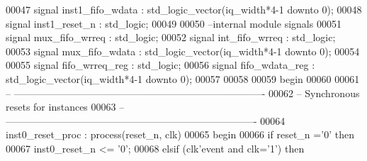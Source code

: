 \begin{DoxyCode}
00047 \textcolor{keywordflow}{signal} \textcolor{vhdlchar}{inst1_fifo_wdata} \textcolor{vhdlchar}{:} \textcolor{comment}{std\_logic\_vector}\textcolor{vhdlchar}{(}\textcolor{vhdlchar}{iq_width}\textcolor{vhdlchar}{*}\textcolor{vhdllogic}{4-1} \textcolor{keywordflow}{downto} \textcolor{vhdllogic}{}\textcolor{vhdllogic}{0}\textcolor{vhdlchar}{)};
00048 \textcolor{keywordflow}{signal} \textcolor{vhdlchar}{inst1_reset_n}        \textcolor{vhdlchar}{:} \textcolor{comment}{std\_logic};
00049 
00050 \textcolor{keyword}{--internal module signals}
00051 \textcolor{keywordflow}{signal} \textcolor{vhdlchar}{mux_fifo_wrreq}   \textcolor{vhdlchar}{:} \textcolor{comment}{std\_logic};
00052 \textcolor{keywordflow}{signal} \textcolor{vhdlchar}{int_fifo_wrreq}   \textcolor{vhdlchar}{:} \textcolor{comment}{std\_logic};
00053 \textcolor{keywordflow}{signal} \textcolor{vhdlchar}{mux_fifo_wdata}   \textcolor{vhdlchar}{:} \textcolor{comment}{std\_logic\_vector}\textcolor{vhdlchar}{(}\textcolor{vhdlchar}{iq_width}\textcolor{vhdlchar}{*}\textcolor{vhdllogic}{4-1} \textcolor{keywordflow}{downto} \textcolor{vhdllogic}{}\textcolor{vhdllogic}{0}\textcolor{vhdlchar}{)};
00054 
00055 \textcolor{keywordflow}{signal} \textcolor{vhdlchar}{fifo_wrreq_reg}   \textcolor{vhdlchar}{:} \textcolor{comment}{std\_logic};
00056 \textcolor{keywordflow}{signal} \textcolor{vhdlchar}{fifo_wdata_reg}   \textcolor{vhdlchar}{:} \textcolor{comment}{std\_logic\_vector}\textcolor{vhdlchar}{(}\textcolor{vhdlchar}{iq_width}\textcolor{vhdlchar}{*}\textcolor{vhdllogic}{4-1} \textcolor{keywordflow}{downto} \textcolor{vhdllogic}{}\textcolor{vhdllogic}{0}\textcolor{vhdlchar}{)};
00057 
00058 
00059 \textcolor{vhdlkeyword}{begin}
00060 
00061 \textcolor{keyword}{-- ----------------------------------------------------------------------------}
00062 \textcolor{keyword}{-- Synchronous resets for instances}
00063 \textcolor{keyword}{-- ----------------------------------------------------------------------------}
00064 inst0\_reset\_proc : \textcolor{keywordflow}{process}(reset_n, clk)
00065 \textcolor{vhdlkeyword}{begin}
00066    \textcolor{keywordflow}{if} \textcolor{vhdlchar}{reset_n} \textcolor{vhdlchar}{=}\textcolor{vhdlchar}{'}\textcolor{vhdllogic}{}\textcolor{vhdllogic}{0}\textcolor{vhdlchar}{'} \textcolor{keywordflow}{then} 
00067       inst0\_reset\_n <= '0';
00068    \textcolor{keywordflow}{elsif} \textcolor{vhdlchar}{(}\textcolor{vhdlchar}{clk}\textcolor{vhdlchar}{'}\textcolor{vhdlkeyword}{event} \textcolor{keywordflow}{and} \textcolor{vhdlchar}{clk}\textcolor{vhdlchar}{=}\textcolor{vhdlchar}{'}\textcolor{vhdllogic}{}\textcolor{vhdllogic}{1}\textcolor{vhdlchar}{'}\textcolor{vhdlchar}{)} \textcolor{keywordflow}{then} 

\end{DoxyCode}
